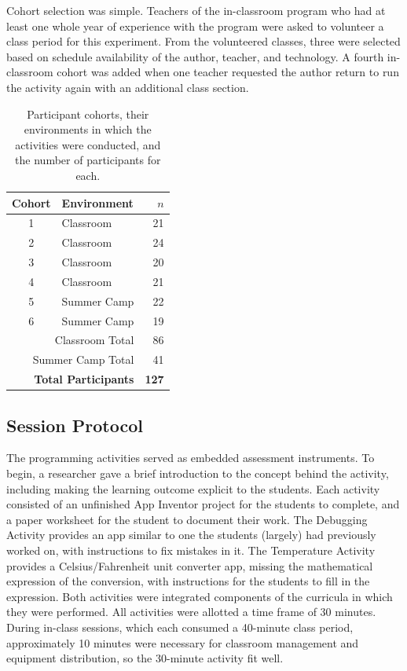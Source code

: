 Cohort selection was simple. Teachers of the in-classroom program who had at least one whole year of experience with the program were asked to volunteer a class period for this experiment. From the volunteered classes, three were selected based on schedule availability of the author, teacher, and technology. A fourth in-classroom cohort was added when one teacher requested the author return to run the activity again with an additional class section.

\begin{table}
\begin{centering}
	\begin{tabular}{clr}
	Cohort & Environment & $n$ \\
	\hline
	1 & Classroom & 21		\\
	2 & Classroom & 24		\\
	3 & Classroom & 20		\\
	4 & Classroom & 21		\\
	5 & Summer Camp & 22	\\
	6 & Summer Camp & 19	\\ \hline
	\multicolumn{2}{r}{Classroom Total} & 86 \\
	\multicolumn{2}{r}{Summer Camp Total} & 41 \\ \hline \hline
	\multicolumn{2}{r}{\textbf{Total Participants}} & \textbf{127} \\ 
	
	\end{tabular}
	\caption[Participant cohorts]{Participant cohorts, their environments in which the activities were conducted, and the number of participants for each.}
	\label{tab:cohorts}
\end{centering}
\end{table}


\subsection{Session Protocol}
The programming activities served as embedded assessment instruments. To begin, a researcher gave a brief introduction to the concept behind the activity, including making the learning outcome explicit to the students. Each activity consisted of an unfinished App Inventor project for the students to complete, and a paper worksheet for the student to document their work. The Debugging Activity provides an app similar to one the students (largely) had previously worked on, with instructions to fix mistakes in it. The Temperature Activity provides a Celsius/Fahrenheit unit converter app, missing the mathematical expression of the conversion, with instructions for the students to fill in the expression. Both activities were integrated components of the curricula in which they were performed. All activities were allotted a time frame of 30 minutes. During in-class sessions, which each consumed a 40-minute class period, approximately 10 minutes were necessary for classroom management and equipment distribution, so the 30-minute activity fit well. 

